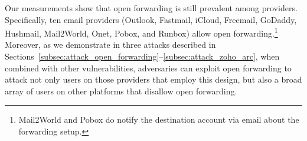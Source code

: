 


Our measurements show that open forwarding is still prevalent among providers.
Specifically, ten email providers (Outlook, Fastmail, iCloud, Freemail, GoDaddy, Hushmail,
Mail2World, Onet, Pobox, and Runbox) allow open
forwarding.\footnote{Mail2World and Pobox do notify the destination account
via email about the forwarding setup.}  Moreover, as we demonstrate in three
attacks described in
Sections~\ref{subsec:attack_open_forwarding}--\ref{subsec:attack_zoho_arc},
when combined with other vulnerabilities, adversaries can exploit open
forwarding to attack not only users on those providers that employ
this design, but also a broad array of users on other platforms that
disallow open forwarding.




